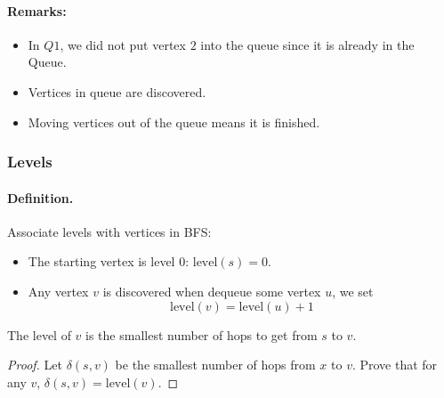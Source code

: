 \documentclass[en,hazy,blue,normal,12pt]{elegantnote}
\newenvironment{claim}[1]{\par\noindent\underline{Claim:}\space#1}{}
\begin{document}
\paragraph{Remarks:}
\begin{itemize}
 \item In $Q1$, we did not put vertex $2$ into the queue since it is already in 
the Queue.
\item Vertices in queue are discovered.
\item Moving vertices out of the queue means it is finished.
\end{itemize}
\subsubsection{Levels}
\paragraph{Definition.}
Associate levels with vertices in BFS: 
\begin{itemize}
 \item The starting vertex is level 0: $\text{level}(s) = 0$.
 \item Any vertex $v$ is discovered when dequeue some vertex $u$, we set
\[\text{level}(v) = \text{level}(u) + 1\]
\end{itemize}

\begin{theorem}
 The level of $v$ is the smallest number of hops to get from $s$ to $v$.
\end{theorem}

\begin{proof}
 Let $\delta(s, v)$ be the smallest number of hops from $x$ to $v$. Prove that for any $v$, $\delta(s, v) = \text{level}(v)$.
\end{proof}

\end{document}
